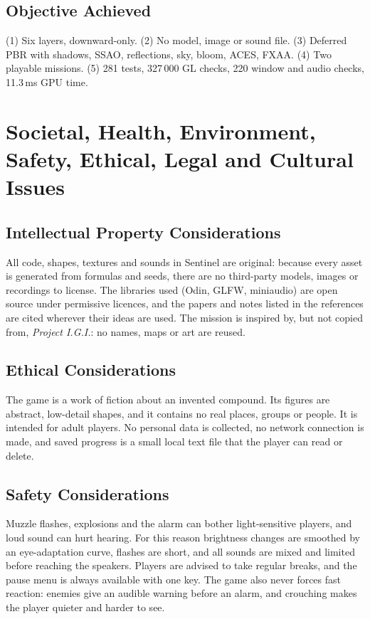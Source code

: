 \documentclass[12pt,a4paper,oneside]{report}
\begin{document}
\section{Objective Achieved}
(1) Six layers, downward-only. (2) No model, image or sound file. (3) Deferred PBR with shadows, SSAO, reflections, sky, bloom, ACES, FXAA. (4) Two playable missions. (5) 281 tests, 327\,000 GL checks, 220 window and audio checks, 11.3\,ms GPU time.



\chapter{Societal, Health, Environment, Safety, Ethical, Legal and Cultural Issues}

\section{Intellectual Property Considerations}
All code, shapes, textures and sounds in Sentinel are original: because every asset is generated from formulas and seeds, there are no third-party models, images or recordings to license. The libraries used (Odin, GLFW, miniaudio) are open source under permissive licences, and the papers and notes listed in the references are cited wherever their ideas are used. The mission is inspired by, but not copied from, \textit{Project I.G.I.}: no names, maps or art are reused.

\section{Ethical Considerations}
The game is a work of fiction about an invented compound. Its figures are abstract, low-detail shapes, and it contains no real places, groups or people. It is intended for adult players. No personal data is collected, no network connection is made, and saved progress is a small local text file that the player can read or delete.

\section{Safety Considerations}
Muzzle flashes, explosions and the alarm can bother light-sensitive players, and loud sound can hurt hearing. For this reason brightness changes are smoothed by an eye-adaptation curve, flashes are short, and all sounds are mixed and limited before reaching the speakers. Players are advised to take regular breaks, and the pause menu is always available with one key. The game also never forces fast reaction: enemies give an audible warning before an alarm, and crouching makes the player quieter and harder to see.
\end{document}
